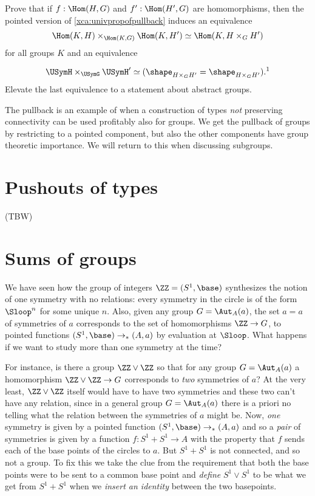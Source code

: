 \begin{xca}
  Prove that if $f:\Hom(H,G)$ and $f':\Hom(H',G)$ are homomorphisms,
  then the pointed version of \cref{xca:univpropofpullback} induces an
  equivalence
  \[
    \Hom(K,H)\times_{\Hom(K,G)}\Hom(K,H')\simeq \Hom(K,H\times_GH')
  \]
  for all groups $K$ and an equivalence%
  \addtocounter{footnote}{-1}
  \[
    \USymH \times_{\USymG} \USymH'
    \simeq (\shape_{H\times_GH'}=\shape_{H\times_GH'}).\text{\footnotemark}
  \]
  Elevate the last equivalence to a statement about abstract groups.
\end{xca}

\begin{remark}
  The pullback is an example of when a construction of types \emph{not} preserving connectivity can be used profitably also for groups.
  We get the pullback of groups by restricting to a pointed component, but also the other components have group theoretic importance.
  We will return to this when discussing subgroups.
\end{remark}

\section{Pushouts of types}
\label{sec:pushouts}

(TBW)

\section{Sums of groups}
\label{sec:coprod}
We have seen how the group of integers $\ZZ=(S^1,\base)$ synthesizes the notion of one symmetry with no relations: every symmetry in the circle is of the form $\Sloop^n$ for some unique $n$.  Also, given any group $G=\Aut_A(a)$, the set $a=a$ of symmetries of $a$ corresponds to the set of homomorphisms $\ZZ\to G$, \ie to pointed functions $(S^1,\base)\to_*(A,a)$ by evaluation at $\Sloop$.  What happens if we want to study more than one symmetry at the time?

For instance, is there a group $\ZZ\vee\ZZ$ so that for any group $G=\Aut_A(a)$ a homomorphism $\ZZ\vee\ZZ\to G$ corresponds to \emph{two} symmetries of $a$?
At the very least, $\ZZ\vee\ZZ$ itself would have to have two symmetries and these two can't have any relation, since in a general group $G=\Aut_A(a)$ there is a priori no telling what the relation between the symmetries of $a$ might be.
Now, \emph{one} symmetry is given by a pointed function $(S^1,\base)\to_*(A,a)$ and so a \emph{pair} of symmetries is given by a function $f:S^1+S^1\to A$ with the property that $f$ sends each of the base points of the circles to $a$.  But $S^1+S^1$ is not connected, and so not a group.  To fix this we take the clue from the requirement that both the base points were to be sent to a common base point and \emph{define} $S^1\vee S^1$ to be what we get from $S^1+S^1$ when we \emph{insert an identity} between the two basepoints.

